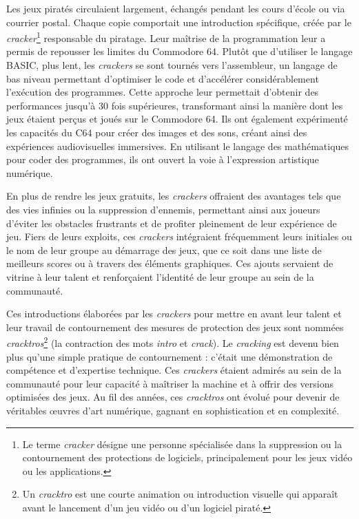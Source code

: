 Les jeux piratés circulaient largement, échangés pendant les cours d'école ou via courrier postal. Chaque copie comportait une introduction spécifique, créée par le \textit{cracker}\footnote{Le terme \textit{cracker} désigne une personne spécialisée dans la suppression ou la contournement des protections de logiciels, principalement pour les jeux vidéo ou les applications.} responsable du piratage. Leur maîtrise de la programmation leur a permis de repousser les limites du Commodore 64. Plutôt que d'utiliser le langage BASIC, plus lent, les \textit{crackers} se sont tournés vers l'assembleur, un langage de bas niveau permettant d'optimiser le code et d'accélérer considérablement l'exécution des programmes. Cette approche leur permettait d'obtenir des performances jusqu'à 30 fois supérieures, transformant ainsi la manière dont les jeux étaient perçus et joués sur le Commodore 64. Ils ont également expérimenté les capacités du C64 pour créer des images et des sons, créant ainsi des expériences audiovisuelles immersives. En utilisant le langage des mathématiques pour coder des programmes, ils ont ouvert la voie à l'expression artistique numérique.

En plus de rendre les jeux gratuits, les \textit{crackers} offraient des avantages tels que des vies infinies ou la suppression d'ennemis, permettant ainsi aux joueurs d'éviter les obstacles frustrants et de profiter pleinement de leur expérience de jeu. Fiers de leurs exploits, ces \textit{crackers} intégraient fréquemment leurs initiales ou le nom de leur groupe au démarrage des jeux, que ce soit dans une liste de meilleurs scores ou à travers des éléments graphiques. Ces ajouts servaient de vitrine à leur talent et renforçaient l'identité de leur groupe au sein de la communauté.

Ces introductions élaborées par les \textit{crackers} pour mettre en avant leur talent et leur travail de contournement des mesures de protection des jeux sont nommées \textit{cracktros}\footnote{Un \textit{cracktro} est une courte animation ou introduction visuelle qui apparaît avant le lancement d'un jeu vidéo ou d'un logiciel piraté.} (la contraction des mots \textit{intro} et \textit{crack}). Le \textit{cracking} est devenu bien plus qu'une simple pratique de contournement : c'était une démonstration de compétence et d'expertise technique. Ces \textit{crackers} étaient admirés au sein de la communauté pour leur capacité à maîtriser la machine et à offrir des versions optimisées des jeux. Au fil des années, ces \textit{cracktros} ont évolué pour devenir de véritables œuvres d'art numérique, gagnant en sophistication et en complexité.

